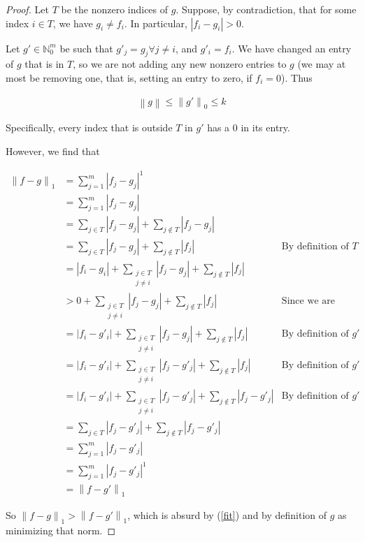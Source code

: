 \documentclass[11pt]{amsart}
\newcommand{\norm}[1]{\left\lVert #1 \right\rVert}
\begin{document}
\begin{proof}
Let $T$ be the nonzero indices of $g$. Suppose, by contradiction, that for some index $i \in T$, we have $g_i \ne f_i$. In particular, $|f_i - g_i| > 0$.

Let $g' \in \mathbb{N}_0^m$ be such that $g'_j = g_j \forall j \ne i$, and $g'_i = f_i$. We have changed an entry of $g$ that is in $T$, so we are not adding any new nonzero entries to $g$ (we may at most be removing one, that is, setting an entry to zero, if $f_i = 0$). Thus 

\begin{align}\label{fit}
\norm{g} \le \norm{g'}_0 \le k
\end{align}

Specifically, every index that is outside $T$ in $g'$ has a 0 in its entry.

However, we find that

\begin{align*}
\norm{f - g}_1 &= \sum_{j = 1}^m |f_j - g_j|^1\\
               &= \sum_{j = 1}^m |f_j - g_j|\\
               &= \sum_{j \in T} |f_j - g_j| + \sum_{j \not\in T} |f_j - g_j|\\
               &= \sum_{j \in T} |f_j - g_j| + \sum_{j \not\in T} |f_j| & \text{By definition of }T\\
               &= |f_i - g_i| + \sum_{\substack{j \in T\\j \ne i}} |f_j - g_j| + \sum_{j \not\in T} |f_j|\\
               &> 0 + \sum_{\substack{j \in T\\j \ne i}} |f_j - g_j| + \sum_{j \not\in T} |f_j| & \text{Since we are dropping a positive term}\\
               &= |f_i - g'_i| + \sum_{\substack{j \in T\\j \ne i}} |f_j - g_j| + \sum_{j \not\in T} |f_j| & \text{By definition of }g'\\
               &= |f_i - g'_i| + \sum_{\substack{j \in T\\j \ne i}} |f_j - g'_j| + \sum_{j \not\in T} |f_j| & \text{By definition of }g'\\
               &= |f_i - g'_i| + \sum_{\substack{j \in T\\j \ne i}} |f_j - g'_j| + \sum_{j \not\in T} |f_j - g'_j| & \text{By definition of }g'\\
               &= \sum_{j \in T} |f_j - g'_j| + \sum_{j \not\in T} |f_j - g'_j|\\
               &= \sum_{j = 1}^m |f_j - g'_j|\\
               &= \sum_{j = 1}^m |f_j - g'_j|^1\\
               &= \norm{f - g'}_1
\end{align*}

So $\norm{f - g}_1 > \norm{f - g'}_1$, which is absurd by (\ref{fit}) and by definition of $g$ as minimizing that norm.
\end{proof}
\end{document}
